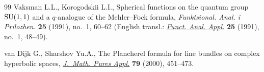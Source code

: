 \documentclass[pdftex]{sigma}
\begin{document}
\begin{thebibliography}{99}
Vaksman L.L., Korogodskii  L.I.,
Spherical functions on the quantum group ${\rm SU}(1,1)$ and a $q$-analogue of the Mehler--Fock formula,
{\it Funktsional. Anal. i Prilozhen.} {\bf 25} (1991), no.~1, 60--62
(English transl.: \href{http://dx.doi.org/10.1007/BF01090677}{{\it Funct. Anal. Appl.}} {\bf 25} (1991), no.~1, 48--49).

van Dijk G., Sharshov Yu.A.,
The Plancherel formula for line bundles on complex hyperbolic spaces,
\href{http://dx.doi.org/10.1016/S0021-7824(00)00152-5}{{\it J.~Math. Pures Appl.}} {\bf 79} (2000),  451--473.

\end{thebibliography}\LastPageEnding
\end{document}
